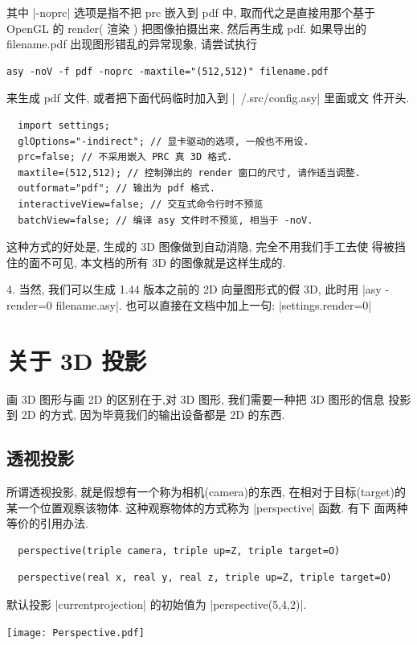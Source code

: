 \documentclass{ctexbook}
\begin{document}
其中 |-noprc| 选项是指不把 prc 嵌入到 pdf 中, 取而代之是直接用那个基于
OpenGL 的 render( 渲染 ) 把图像拍摄出来, 然后再生成 pdf. 如果导出的
filename.pdf 出现图形错乱的异常现象, 请尝试执行
\begin{verbatim}
asy -noV -f pdf -noprc -maxtile="(512,512)" filename.pdf
\end{verbatim}
来生成 pdf 文件, 或者把下面代码临时加入到 |~/.src/config.asy| 里面或文
件开头.
\begin{lstlisting}
  import settings;
  glOptions="-indirect"; // 显卡驱动的选项, 一般也不用设.
  prc=false; // 不采用嵌入 PRC 真 3D 格式.
  maxtile=(512,512); // 控制弹出的 render 窗口的尺寸, 请作适当调整.
  outformat="pdf"; // 输出为 pdf 格式.
  interactiveView=false; // 交互式命令行时不预览
  batchView=false; // 编译 asy 文件时不预览, 相当于 -noV.
\end{lstlisting}
这种方式的好处是, 生成的 3D 图像做到自动消隐, 完全不用我们手工去使
得被挡住的面不可见, 本文档的所有 3D 的图像就是这样生成的.


4. 当然, 我们可以生成 1.44 版本之前的 2D 向量图形式的假 3D, 此时用
|asy -render=0 filename.asy|.
也可以直接在文档中加上一句: |settings.render=0|

\section{关于 3D 投影}
画 3D 图形与画 2D 的区别在于,对 3D 图形, 我们需要一种把 3D 图形的信息
投影到 2D 的方式, 因为毕竟我们的输出设备都是 2D 的东西.

\subsection{透视投影}
所谓透视投影, 就是假想有一个称为相机(camera)的东西, 在相对于目标(target)的
某一个位置观察该物体. 这种观察物体的方式称为 |perspective| 函数. 有下
面两种等价的引用办法.
\begin{lstlisting}
  perspective(triple camera, triple up=Z, triple target=O)
\end{lstlisting}

\begin{lstlisting}
  perspective(real x, real y, real z, triple up=Z, triple target=O)
\end{lstlisting}
默认投影 |currentprojection| 的初始值为 |perspective(5,4,2)|.

\begin{center}\texttt{[image: Perspective.pdf]}\end{center}%

\end{document}
